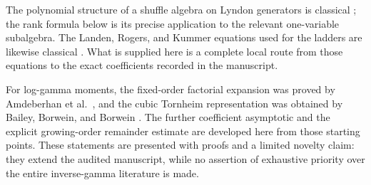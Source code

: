 The polynomial structure of a shuffle algebra on Lyndon generators is
classical \cite{Radford}; the rank formula below is its precise
application to the relevant one-variable subalgebra.
The Landen, Rogers, and Kummer equations used for the ladders are likewise
classical \cite{Zagier,NakamuraShiraishi}. What is supplied here is a
complete local route from those equations to the exact coefficients
recorded in the manuscript.

For log-gamma moments, the fixed-order factorial expansion was proved by
Amdeberhan et al.\ \cite{ACEMKM}, and the cubic Tornheim representation
was obtained by Bailey, Borwein, and Borwein \cite{BBB}.
The further coefficient asymptotic and the explicit growing-order
remainder estimate are developed here from those starting points.
These statements are presented with proofs and a limited novelty claim:
they extend the audited manuscript, while no assertion of exhaustive
priority over the entire inverse-gamma literature is made.
